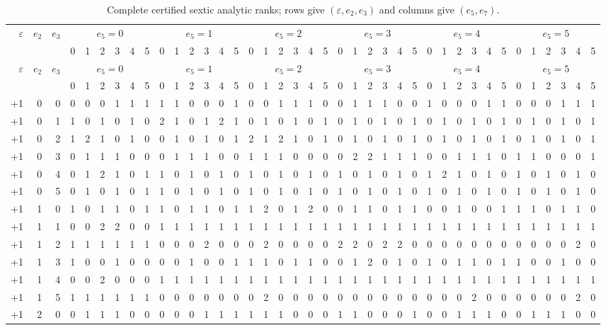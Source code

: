 {
\scriptsize
\setlength{\tabcolsep}{2pt}
\begin{longtable}{rrr|rrrrrr|rrrrrr|rrrrrr|rrrrrr|rrrrrr|rrrrrr}
\caption{Complete certified sextic analytic ranks; rows give $(\varepsilon,e_2,e_3)$ and columns give $(e_5,e_7)$.}\\
\toprule
$\varepsilon$&$e_2$&$e_3$&\multicolumn{6}{c}{$e_5=0$}&\multicolumn{6}{c}{$e_5=1$}&\multicolumn{6}{c}{$e_5=2$}&\multicolumn{6}{c}{$e_5=3$}&\multicolumn{6}{c}{$e_5=4$}&\multicolumn{6}{c}{$e_5=5$}\\
&&&0&1&2&3&4&5&0&1&2&3&4&5&0&1&2&3&4&5&0&1&2&3&4&5&0&1&2&3&4&5&0&1&2&3&4&5\\
\midrule
\endfirsthead
\toprule
$\varepsilon$&$e_2$&$e_3$&\multicolumn{6}{c}{$e_5=0$}&\multicolumn{6}{c}{$e_5=1$}&\multicolumn{6}{c}{$e_5=2$}&\multicolumn{6}{c}{$e_5=3$}&\multicolumn{6}{c}{$e_5=4$}&\multicolumn{6}{c}{$e_5=5$}\\
&&&0&1&2&3&4&5&0&1&2&3&4&5&0&1&2&3&4&5&0&1&2&3&4&5&0&1&2&3&4&5&0&1&2&3&4&5\\
\midrule
\endhead
\bottomrule\endfoot
+1&0&0&0&0&0&1&1&1&1&1&0&0&0&1&0&0&1&1&1&0&0&1&1&1&0&0&1&0&0&0&1&1&0&0&0&1&1&1\\
+1&0&1&1&0&1&0&1&0&2&1&0&1&2&1&0&1&0&1&0&1&0&1&0&1&0&1&0&1&0&1&0&1&0&1&0&1&0&1\\
+1&0&2&1&2&1&0&1&0&0&1&0&1&0&1&2&1&2&1&0&1&0&1&0&1&0&1&0&1&0&1&0&1&0&1&0&1&0&1\\
+1&0&3&0&1&1&1&0&0&0&1&1&1&0&0&1&1&1&0&0&0&0&2&2&1&1&1&0&0&1&1&1&0&1&1&0&0&0&1\\
+1&0&4&0&1&2&1&0&1&1&0&1&0&1&0&1&0&1&0&1&0&1&0&1&0&1&0&1&2&1&0&1&0&1&0&1&0&1&0\\
+1&0&5&0&1&0&1&0&1&1&0&1&0&1&0&1&0&1&0&1&0&1&0&1&0&1&0&1&0&1&0&1&0&1&0&1&0&1&0\\
+1&1&0&1&0&1&1&0&1&1&0&1&1&0&1&1&2&0&1&2&0&0&1&1&0&1&1&0&0&1&0&0&1&1&1&0&1&1&0\\
+1&1&1&0&0&2&2&0&0&1&1&1&1&1&1&1&1&1&1&1&1&1&1&1&1&1&1&1&1&1&1&1&1&1&1&1&1&1&1\\
+1&1&2&1&1&1&1&1&1&0&0&0&2&0&0&0&2&0&0&0&0&2&2&0&2&2&0&0&0&0&0&0&0&0&0&0&0&2&0\\
+1&1&3&1&0&0&1&0&0&0&0&1&0&0&1&1&1&0&1&1&0&0&1&2&0&1&0&1&0&1&1&0&1&1&0&0&1&0&0\\
+1&1&4&0&0&2&0&0&0&1&1&1&1&1&1&1&1&1&1&1&1&1&1&1&1&1&1&1&1&1&1&1&1&1&1&1&1&1&1\\
+1&1&5&1&1&1&1&1&1&0&0&0&0&0&0&0&2&0&0&0&0&0&0&0&0&0&0&0&0&0&2&0&0&0&0&0&0&2&0\\
+1&2&0&0&1&1&1&0&0&0&0&0&1&1&1&1&1&1&0&0&0&1&1&0&0&0&1&0&0&1&1&1&0&0&1&1&1&0&0\\

\end{longtable}}
